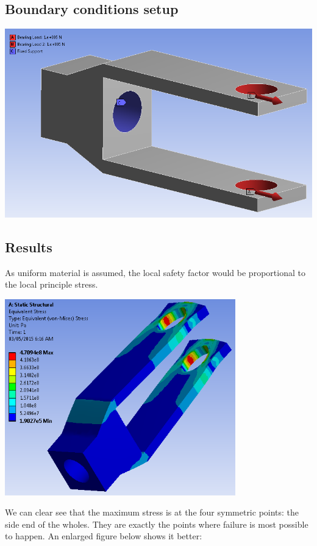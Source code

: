 \documentclass[a4paper,14pt]{extarticle}
\begin{document}
\subsection{Boundary conditions setup}
\includegraphics[width=\textwidth]{Model.PNG}
\subsection{Results}
As uniform material is assumed, the local safety factor would be proportional to the local principle stress.

\begin{center}\includegraphics[width=0.75\textwidth]{STRESS_DEFAULT.PNG}\end{center}

We can clear see that the maximum stress is at the four symmetric points: the side end of the wholes. They are exactly the points where failure is most possible to happen.  An enlarged figure below shows it better:
\end{document}
